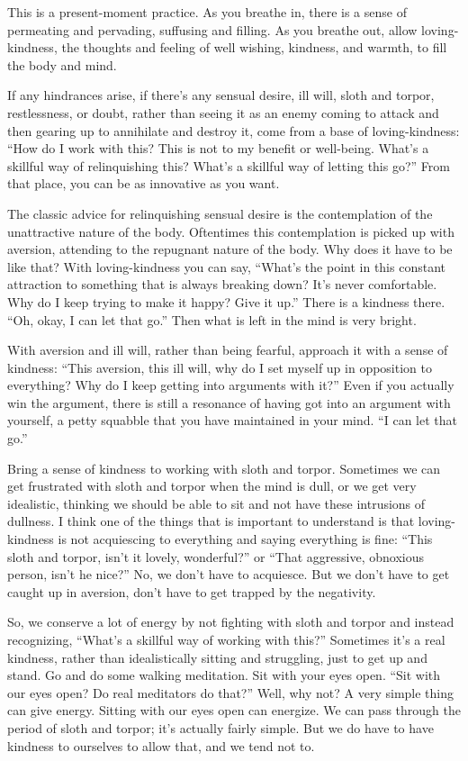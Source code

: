 This is a present-moment practice. As you breathe in, there is a sense
of permeating and pervading, suffusing and filling. As you breathe out,
allow loving-kindness, the thoughts and feeling of well wishing,
kindness, and warmth, to fill the body and mind.

If any hindrances arise, if there’s any sensual desire, ill will, sloth
and torpor, restlessness, or doubt, rather than seeing it as an enemy
coming to attack and then gearing up to annihilate and destroy it, come
from a base of loving-kindness: “How do I work with this? This is not to
my benefit or well-being. What’s a skillful way of relinquishing this?
What’s a skillful way of letting this go?” From that place, you can be
as innovative as you want.

The classic advice for relinquishing sensual desire is the contemplation
of the unattractive nature of the body. Oftentimes this contemplation is
picked up with aversion, attending to the repugnant nature of the body.
Why does it have to be like that? With loving-kindness you can say,
“What’s the point in this constant attraction to something that is
always breaking down? It’s never comfortable. Why do I keep trying to
make it happy? Give it up.” There is a kindness there. “Oh, okay, I can
let that go.” Then what is left in the mind is very bright.

With aversion and ill will, rather than being fearful, approach it with
a sense of kindness: “This aversion, this ill will, why do I set myself
up in opposition to everything? Why do I keep getting into arguments
with it?” Even if you actually win the argument, there is still a
resonance of having got into an argument with yourself, a petty squabble
that you have maintained in your mind. “I can let that go.”

Bring a sense of kindness to working with sloth and torpor. Sometimes we
can get frustrated with sloth and torpor when the mind is dull, or we
get very idealistic, thinking we should be able to sit and not have
these intrusions of dullness. I think one of the things that is
important to understand is that loving-kindness is not acquiescing to
everything and saying everything is fine: “This sloth and torpor, isn’t
it lovely, wonderful?” or “That aggressive, obnoxious person, isn’t he
nice?” No, we don’t have to acquiesce. But we don’t have to get caught
up in aversion, don’t have to get trapped by the negativity.

So, we conserve a lot of energy by not fighting with sloth and torpor
and instead recognizing, “What’s a skillful way of working with this?”
Sometimes it’s a real kindness, rather than idealistically sitting and
struggling, just to get up and stand. Go and do some walking meditation.
Sit with your eyes open. “Sit with our eyes open? Do real meditators do
that?” Well, why not? A very simple thing can give energy. Sitting with
our eyes open can energize. We can pass through the period of sloth and
torpor; it’s actually fairly simple. But we do have to have kindness to
ourselves to allow that, and we tend not to.

